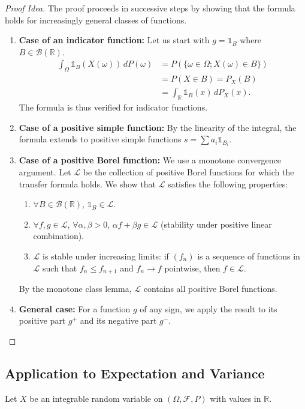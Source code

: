 \begin{proof}[Proof Idea]
The proof proceeds in successive steps by showing that the formula holds for increasingly general classes of functions.
\begin{enumerate}
    \item \textbf{Case of an indicator function:} Let us start with $g = \mathbb{1}_B$ where $B \in \mathcal{B}(\mathbb{R})$.
    \begin{align*}
    \int_{\Omega} \mathbb{1}_B(X(\omega)) \,dP(\omega) &= P(\{\omega \in \Omega; X(\omega) \in B\}) \\
    &= P(X \in B) = P_X(B) \\
    &= \int_{\mathbb{R}} \mathbb{1}_B(x) \,dP_X(x).
    \end{align*}
    The formula is thus verified for indicator functions.
    \item \textbf{Case of a positive simple function:} By the linearity of the integral, the formula extends to positive simple functions $s = \sum a_i \mathbb{1}_{B_i}$.
    \item \textbf{Case of a positive Borel function:} We use a monotone convergence argument. Let $\mathcal{L}$ be the collection of positive Borel functions for which the transfer formula holds. We show that $\mathcal{L}$ satisfies the following properties:
    \begin{enumerate}
        \item[(i)] $\forall B \in \mathcal{B}(\mathbb{R})$, $\mathbb{1}_B \in \mathcal{L}$.
        \item[(ii)] $\forall f,g \in \mathcal{L}$, $\forall \alpha, \beta > 0$, $\alpha f + \beta g \in \mathcal{L}$ (stability under positive linear combination).
        \item[(iii)] $\mathcal{L}$ is stable under increasing limits: if $(f_n)$ is a sequence of functions in $\mathcal{L}$ such that $f_n \le f_{n+1}$ and $f_n \to f$ pointwise, then $f \in \mathcal{L}$.
    \end{enumerate}
    By the monotone class lemma, $\mathcal{L}$ contains all positive Borel functions.
    \item \textbf{General case:} For a function $g$ of any sign, we apply the result to its positive part $g^+$ and its negative part $g^-$.
\end{enumerate}
\end{proof}%
\subsection{Application to Expectation and Variance}%
Let $X$ be an integrable random variable on $(\Omega, \mathcal{F}, P)$ with values in $\mathbb{R}$.

